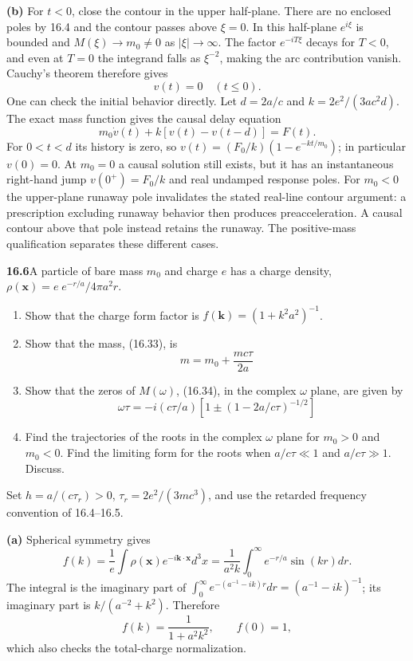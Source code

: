 \textbf{(b)} For $t<0$, close the contour in the upper half-plane.
There are no enclosed poles by 16.4 and the contour passes above
$\xi=0$. In this half-plane $e^{i\xi}$ is bounded and
$M(\xi)\to m_0\ne0$ as $|\xi|\to\infty$.
The factor $e^{-iT\xi}$ decays for $T<0$, and even at $T=0$ the
integrand falls as $\xi^{-2}$, making the arc contribution vanish.
Cauchy's theorem therefore gives
\[
\boxed{v(t)=0\quad(t\le0).}
\]
One can check the initial behavior directly. Let $d=2a/c$ and
$k=2e^2/(3ac^2d)$. The exact mass function gives the causal delay equation
\[
m_0\dot v(t)+k[v(t)-v(t-d)]=F(t).
\]
For $0<t<d$ its history is zero, so
$v(t)=(F_0/k)(1-e^{-kt/m_0})$; in particular $v(0)=0$.
At $m_0=0$ a causal solution still exists, but it has an instantaneous
right-hand jump $v(0^+)=F_0/k$ and real undamped response poles.
For $m_0<0$ the upper-plane runaway pole invalidates the stated
real-line contour argument: a prescription excluding runaway behavior
then produces preacceleration. A causal contour above that pole
instead retains the runaway. The positive-mass qualification separates
these different cases.

\par\bigskip
\noindent\textbf{16.6}\quad A particle of bare mass $m_{0}$ and charge $e$ has a charge density, $\rho(\mathbf{x})=e\;e^{-r/a}/4\pi a^{2}r$.
\begin{enumerate}
\item[(a)] Show that the charge form factor is $f(\mathbf{k})=(1+k^{2}a^{2})^{-1}$.
\item[(b)] Show that the mass, (16.33), is
\[
m=m_{0}+\frac{mc\tau}{2a}
\]
\item[(c)] Show that the zeros of $M(\omega)$, (16.34), in the complex $\omega$ plane, are given by
\[
\omega\tau=-i(c\tau/a)\left[1\pm(1-2a/c\tau)^{-1/2}\right]
\]
\item[(d)] Find the trajectories of the roots in the complex $\omega$ plane for $m_{0}>0$ and $m_{0}<0$. Find the limiting form for the roots when $a/c\tau\ll1$ and $a/c\tau\gg1$. Discuss.
\end{enumerate}
\solution

Set $h=a/(c\tau_r)>0$, $\tau_r=2e^2/(3mc^3)$, and use the retarded
frequency convention of 16.4--16.5.

\textbf{(a)} Spherical symmetry gives
\[
f(k)=\frac1e\int\rho(\mathbf x)e^{-i\mathbf k\cdot\mathbf x}d^3x
=\frac1{a^2k}\int_0^\infty e^{-r/a}\sin(kr)dr.
\]
The integral is the imaginary part of
$\int_0^\infty e^{-(a^{-1}-ik)r}dr=(a^{-1}-ik)^{-1}$;
its imaginary part is $k/(a^{-2}+k^2)$. Therefore
\[
\boxed{f(k)=\frac1{1+a^2k^2},\qquad f(0)=1,}
\]
which also checks the total-charge normalization.

